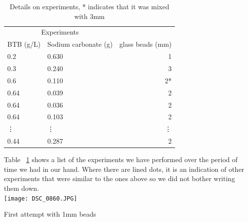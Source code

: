 \documentclass[twoside]{article}
\begin{document}
\begin{multicols}{2}
\begin{table}[H]
\caption{Details on experiments, * indicates that it was mixed with 3mm}
\centering
\begin{tabular}{lp{1.6cm}r}
\toprule
\multicolumn{2}{c}{Experiments} \\
\cmidrule(r){1-3}
BTB (g/L) & Sodium carbonate (g) & glass beads (mm) \\
\midrule
0.2  & 0.630 & 1 \\
0.3  & 0.240 & 3 \\
0.6 & 0.110 & 2* \\
0.64 & 0.039 & 2 \\
0.64 & 0.036 & 2 \\ 
0.64 & 0.103 & 2 \\
 \vdots & \vdots & \vdots \\
0.44 & 0.287 & 2 \\
\bottomrule
\end{tabular}
\label{fig:tabel}
\end{table}
Table ~\ref{fig:tabel} shows a list of the experiments we have performed over the period of time we had in our hand. Where there are lined dots, it is an indication of other experiments that were similar to the ones above so we did not bother writing them down. \\

\texttt{[image: DSC\_0860.JPG]}\label{fig:first_attempt}
\caption{First attempt with 1mm beads}
\vspace{0.3cm} \newpage


\end{multicols}
\end{document}

